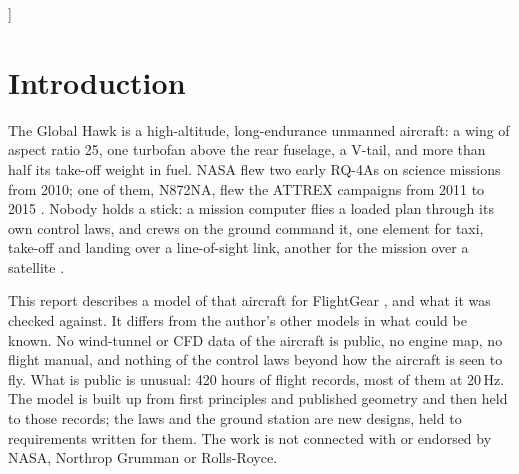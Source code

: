 \documentclass[10pt,a4paper,twocolumn]{article}
\begin{document}
\begin{@twocolumnfalse}
\begin{abstract}
(NASA's ``31+'', the RQ-4A's official record of 30\,h 24\,min, later blocks' 33 to 35\,h) are capabilities and records with unknown reserves and
payloads, so they are a sanity window, not a target; without the ceiling the model climbs past it and reaches 35.1\,h. The wing section's pitching moment grows with Mach number faster in the section data than in the
tunnel, which one fitted exponent corrects, and with it the bare airframe's speed mode at the cruise becomes stable. The flight laws are the author's design and are held to their own requirements only: they fly a mission
from stand to stand, the two recorded landings within 5\,KEAS and 0.5\,m/s of the records, a navigator failure of the kind that destroyed an RQ-4B in 2017, a
lost link, and a landing without the engine. In FlightGear the aircraft is flown through the station's link by the same logic.
Landings in gusts are flown in hundreds on a bench and in FlightGear: a stabilisation of the landing law lowers the hard landings where this aircraft lands hard, two airliners' rules of thumb for the
approach speed buy margin to the stall limit and pay for it in sink, runway and, for one of them, the structural limits, and the low wing's tips, which bend, set the limit on the bank at touchdown.
Limits were set before results and not moved: \Npass{} checks pass and \Nmiss{} miss. Only \NFpass{} of the passes are held to flight records, \Nfitted{} of them after
a fit to the same record; \NDpass{} are the laws and the software against the author's own requirements. Every miss is listed with its cause.
\end{abstract}
\vspace{6pt}
\end{@twocolumnfalse}
]

\section{Introduction}
The Global Hawk is a high-altitude, long-endurance unmanned aircraft: a wing of aspect ratio 25, one turbofan above the rear fuselage, a V-tail, and more
than half its take-off weight in fuel. NASA flew two early RQ-4As on science missions from 2010; one of them, N872NA, flew the ATTREX campaigns from 2011
to 2015 \cite{ov}. Nobody holds a stick: a mission computer flies a loaded plan through its own control laws, and crews on the ground command it, one
element for taxi, take-off and landing over a line-of-sight link, another for the mission over a satellite \cite{ops}.

This report describes a model of that aircraft for FlightGear \cite{fg}, and what it was checked against. It differs from the author's other
models in what could be known. No wind-tunnel or CFD data of the aircraft is public, no engine map, no flight manual, and nothing of the control laws
beyond how the aircraft is seen to fly. What is public is unusual: 420 hours of flight records, most of them at 20\,Hz. The model is built up from first
principles and published geometry and then held to those records; the laws and the ground station are new designs, held to requirements written for them.
The work is not connected with or endorsed by NASA, Northrop Grumman or Rolls-Royce.
\end{document}
